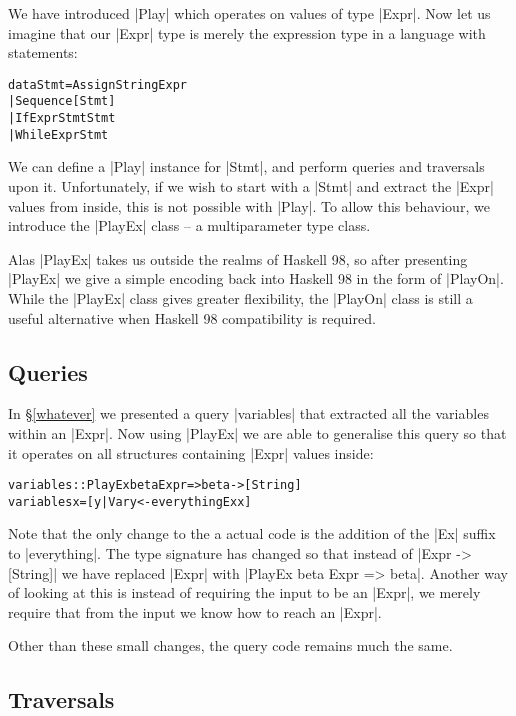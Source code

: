 \documentclass[preprint]{sigplanconf}
\newenvironment{code}{\begin{alltt}\small}{\end{alltt}}
\begin{document}
We have introduced |Play| which operates on values of type |Expr|. Now let us imagine that our |Expr| type is merely the expression type in a language with statements:

\begin{code}
data Stmt  =  Assign String Expr
           |  Sequence [Stmt]
           |  If Expr Stmt Stmt
           |  While Expr Stmt
\end{code}

We can define a |Play| instance for |Stmt|, and perform queries and traversals upon it. Unfortunately, if we wish to start with a |Stmt| and extract the |Expr| values from inside, this is not possible with |Play|. To allow this behaviour, we introduce the |PlayEx| class -- a multiparameter type class.

Alas |PlayEx| takes us outside the realms of Haskell 98, so after presenting |PlayEx| we give a simple encoding back into Haskell 98 in the form of |PlayOn|. While the |PlayEx| class gives greater flexibility, the |PlayOn| class is still a useful alternative when Haskell 98 compatibility is required.

\subsection{Queries}

In \S\ref{whatever} we presented a query |variables| that extracted all the variables within an |Expr|. Now using |PlayEx| we are able to generalise this query so that it operates on all structures containing |Expr| values inside:

\begin{code}
variables :: PlayEx beta Expr => beta -> [String]
variables x = [y | Var y <- everythingEx x]
\end{code}

Note that the only change to the a actual code is the addition of the |Ex| suffix to |everything|. The type signature has changed so that instead of |Expr -> [String]| we have replaced |Expr| with |PlayEx beta Expr => beta|. Another way of looking at this is instead of requiring the input to be an |Expr|, we merely require that from the input we know how to reach an |Expr|.

Other than these small changes, the query code remains much the same.

\subsection{Traversals}
\end{document}
